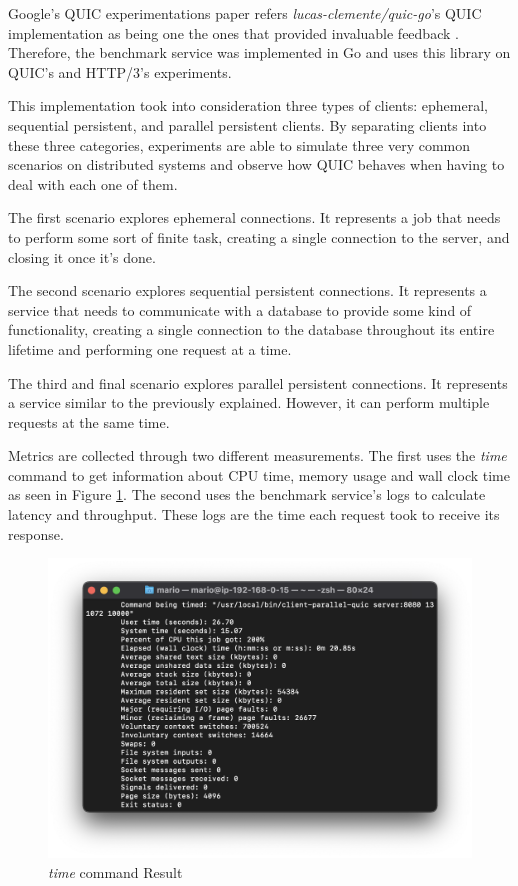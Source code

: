Google's QUIC experimentations paper refers \textit{lucas-clemente/quic-go}'s QUIC implementation as being one the ones that provided invaluable feedback \cite{quic_protocol}. Therefore, the benchmark service was implemented in Go and uses this library on QUIC's and HTTP/3's experiments.

This implementation took into consideration three types of clients: ephemeral, sequential persistent, and parallel persistent clients. By separating clients into these three categories, experiments are able to simulate three very common scenarios on distributed systems and observe how QUIC behaves when having to deal with each one of them.

The first scenario explores ephemeral connections. It represents a job that needs to perform some sort of finite task, creating a single connection to the server, and closing it once it’s done.

The second scenario explores sequential persistent connections. It represents a service that needs to communicate with a database to provide some kind of functionality, creating a single connection to the database throughout its entire lifetime and performing one request at a time.

The third and final scenario explores parallel persistent connections. It represents a service similar to the previously explained. However, it can perform multiple requests at the same time.

Metrics are collected through two different measurements. The first uses the \textit{time} command to get information about CPU time, memory usage and wall clock time as seen in Figure \ref{fig:time_command}. The second uses the benchmark service's logs to calculate latency and throughput. These logs are the time each request took to receive its response.

\begin{figure}[h!]
    \centering
    \includegraphics[width=\linewidth]{figures/time.png}
    \caption{\textit{time} command Result}
    \label{fig:time_command}
\end{figure}

